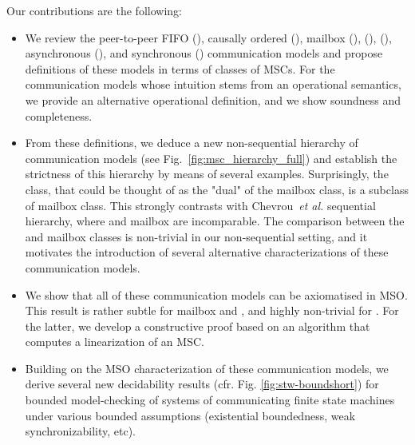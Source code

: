 
Our contributions are the following:
\begin{itemize}
	\item We review the peer-to-peer FIFO (\pp), causally ordered (\co), mailbox (\mb), \onen (\onensymb), \nn (\nnsymb), asynchronous (\asy), and synchronous (\rsc) communication models
	and propose definitions of these models in terms of classes of MSCs. For the communication models whose intuition stems from
	an operational semantics, we provide an alternative operational definition, and we show soundness and completeness.

	\item From these definitions, we deduce a new non-sequential hierarchy of communication models (see Fig.~\ref{fig:msc_hierarchy_full})
	and establish the strictness of this hierarchy by means of several examples.
	Surprisingly, the \onen class, that could be thought of as the "dual" of the mailbox class, is a subclass of mailbox class. This strongly
	contrasts with Chevrou~\emph{et al.} sequential hierarchy, where \onen and mailbox are incomparable. The comparison between
	the \onen and mailbox classes is non-trivial in our non-sequential setting, and it motivates the introduction
	of several  alternative characterizations of these communication models.

	\item We show that all of these communication models can be axiomatised in MSO. This result is rather subtle for mailbox and \onen, and highly non-trivial for \nn. For the latter, we develop a constructive proof based on an
	algorithm that computes a \nn linearization of an MSC.

	\item Building on the MSO characterization of these communication models, we derive several new decidability results (cfr. Fig. \ref{fig:stw-boundshort}) for bounded
	model-checking of systems of communicating finite state machines under various bounded assumptions (existential boundedness, weak synchronizability, etc).
\end{itemize}



